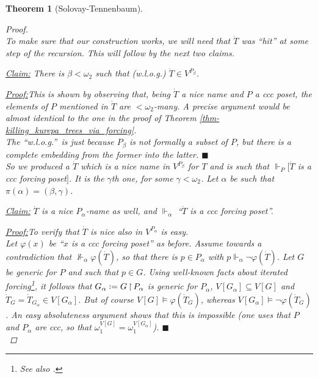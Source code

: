 \documentclass[11pt,a4paper]{report}
\newtheorem{theorem}{Theorem}[chapter] %
\theoremstyle{definition}
\theoremstyle{num.custom-title}
\theoremstyle{custom-title}
\newenvironment{claim}[1]{\par\noindent\underline{Claim#1:}\space}{} %
\newenvironment{claimproof}[1]{\par\noindent\underline{Proof:}\space#1}{\leavevmode\unskip\penalty9999 \hbox{}\nobreak\hfill\quad\hbox{$\blacksquare$}} %
\DeclareMathOperator{\sse}{\subseteq}
\DeclareMathOperator{\restr}{\upharpoonright}
\newcommand*{\defeq}{\mathrel{\rlap{%
                     \raisebox{0.3ex}{$\cdot$}}%
                     \raisebox{-0.3ex}{$\cdot$}}%
                     =}
\renewcommand{\phi}{\varphi}
\newcommand{\forces}{\Vdash}
\begin{document}
\begin{theorem}[Solovay-Tennenbaum]
\begin{proof}
\\[6pt]
To make sure that our construction works, we will need that $\dot{T}$ was ``hit'' at some step of the recursion. This will follow by the next two claims.
\\[-10pt]
\begin{claim}{}
There is $\beta < \omega_2$ such that (w.l.o.g.) $\dot{T} \in V^{P_\beta}$.
\begin{claimproof}
This is shown by observing that, being $\dot{T}$ a nice name and $P$ a ccc poset, the elements of $P$ mentioned in $\dot{T}$ are $<\omega_2$-many. A precise argument would be almost identical to the one in the proof of Theorem \ref{thm-killing_kurepa_trees_via_forcing}.\\
The ``w.l.o.g.''\ is just because $P_\beta$ is not formally a subset of $P$, but there is a complete embedding from the former into the latter.
\end{claimproof}
\end{claim}
\\[6pt]
So we produced a $\dot{T}$ which is a nice name in $V^{P_\beta}$ for $T$ and is such that $\forces_P [\dot{T}$ is a ccc forcing poset$]$. It is the $\gamma$th one, for some $\gamma < \omega_2$.  Let $\alpha$ be such that $\pi(\alpha) = (\beta,\gamma)$.
 \\[-10pt]
\begin{claim}{}
$\dot{T}$ is a nice $P_\alpha$-name as well, and $\forces_\alpha$ ``$\dot{T}$ is a ccc forcing poset''.
\begin{claimproof}
To verify that $\dot{T}$ is nice also in $V^{P_\alpha}$ is easy.\\
Let $\phi(x)$ be ``$x$ is a ccc forcing poset'' as before. Assume towards a contradiction that $\not\forces_\alpha \phi(\dot{T})$, so that there is $p \in P_\alpha$ with $p \forces_\alpha \neg\phi(\dot{T})$. Let $G$ be generic for $P$ and such that $p \in G$. Using well-known facts about iterated forcing\footnote{See also \cite[Lemma IV.4.2 and Lemma IV.4.4, pp.\ 270-71]{Kun2013}.}, it follows that $G_\alpha \defeq G \restr P_\alpha$ is generic for $P_\alpha$, $V[G_\alpha] \sse V[G]$ and $\dot{T}_G = \dot{T}_{G_\alpha} \in V[G_\alpha]$. But of course $V[G] \models \phi(\dot{T}_G)$, whereas $V[G_\alpha] \models \neg\phi(\dot{T}_G)$. An easy absoluteness argument shows that this is impossible (one uses that $P$ and $P_\alpha$ are ccc, so that $\omega_1^{V[G]} = \omega_1^{V[G_\alpha]}$).
\end{claimproof}
\end{claim}
\\[6pt]

\end{proof}
\end{theorem}
\end{document}
